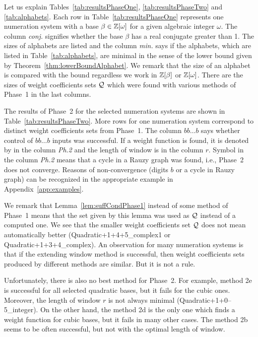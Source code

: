 Let us explain Tables~\ref{tab:resultsPhaseOne}, \ref{tab:resultsPhaseTwo} and \ref{tab:alphabets}. Each row in Table~\ref{tab:resultsPhaseOne} represents one numeration system with a base $\beta\in\mathbb{Z}[\omega]$ for a given algebraic integer $\omega$. The column \emph{conj.} signifies whether the base $\beta$ has a real conjugate greater than 1. The sizes of alphabets are listed and the column \emph{min.} says if the alphabets, which are listed in Table~\ref{tab:alphabets}, are minimal in the sense of the lower bound given by Theorem~\ref{thm:lowerBoundAlphabet}.  We remark that the size of an alphabet is compared with the bound regardless we work in $\mathbb{Z}[\beta]$ or $\mathbb{Z}[\omega]$. 
There are the sizes of weight coefficients sets $\mathcal{Q}$ which were found  with various methods of Phase~1 in the last columns.

The results of Phase~2 for the selected numeration systems are shown in Table~\ref{tab:resultsPhaseTwo}. More rows for one numeration system correspond to distinct weight coefficients sets from Phase~1. The column $bb\dots b$ says whether control of $bb\dots b$ inputs was successful. If a weight function is found, it is denoted by \checkmark{} in the column \emph{Ph.2} and the length of window is in the column $r$. Symbol \xmark{} in the column \emph{Ph.2} means that a cycle in a Rauzy graph was found, i.e., Phase~2 does not converge. Reasons of non-convergence (digits $b$ or a cycle in Rauzy graph) can be recognized in the appropriate example in Appendix~\ref{app:examples}.

We remark that Lemma~\ref{lem:suffCondPhase1} instead of some method of Phase~1 means that the set given by this lemma was used as $\mathcal{Q}$ instead of a computed one.  We see that the smaller weight coefficients set $\mathcal{Q}$ does not mean automatically better (Quadratic+1+4+5\_complex1 or Quadratic+1+3+4\_complex). An observation for many numeration systems is that if the extending window method is successful, then weight coefficients sets produced by different methods are similar. But it is not a rule. 

Unfortunately, there is also no best method for Phase~2. For example, method 2e is successful for all selected quadratic bases, but it fails for the cubic ones. Moreover, the length of window $r$ is not always minimal (Quadratic+1+0--5\_integer). On the other hand, the method 2d is the only one which finds a weight function for cubic bases, but it fails in many other cases. The method 2b seems to be often successful, but not with the optimal length of window.

